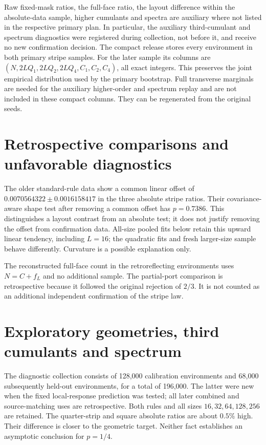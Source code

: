 \documentclass[10pt,a4paper]{article}
\begin{document}
Raw fixed-mask ratios, the full-face ratio, the layout difference within
the absolute-data sample, higher cumulants and spectra are auxiliary where
not listed in the respective primary plan. In particular, the auxiliary
third-cumulant and spectrum diagnostics were registered during collection,
not before it, and receive no new confirmation decision.
The compact release stores every environment in both primary stripe
samples. For the later sample its columns are
\((N,2LQ_1,2LQ_2,2LQ_4,C_1,C_2,C_4)\), all exact integers.
This preserves the joint empirical distribution used by the primary
bootstrap. Full transverse marginals are needed for the auxiliary
higher-order and spectrum replay and are not included in these compact
columns. They can be regenerated from the original seeds.






\section{Retrospective comparisons and unfavorable diagnostics}
The older standard-rule data show a common linear offset of
\(0.0070564322\pm0.0016158417\) in the three absolute stripe ratios.
Their covariance-aware shape test after removing a common offset has
\(p=0.7386\). This distinguishes a layout contrast from an absolute test;
it does not justify removing the offset from confirmation data.
All-size pooled fits below retain this upward linear tendency, including
\(L=16\); the quadratic fits and fresh larger-size sample behave differently.
Curvature is a possible explanation only.



The reconstructed full-face count in the retroreflecting environments
uses \(N=C+f_L\) and no additional sample. The partial-port comparison
is retrospective because it followed the original rejection of \(2/3\).
It is not counted as an additional independent confirmation of the stripe law.

\section{Exploratory geometries, third cumulants and spectrum}
The diagnostic collection consists of 128,000 calibration environments and
68,000 subsequently held-out environments, for a total of 196,000.
The latter were new when the fixed local-response prediction was tested;
all later combined and source-matching uses are retrospective.
Both rules and all sizes \(16,32,64,128,256\) are retained.
The quarter-strip and square absolute ratios are about \(0.5\%\) high.
Their difference is closer to the geometric target. Neither fact establishes
an asymptotic conclusion for \(p=1/4\).
\end{document}
